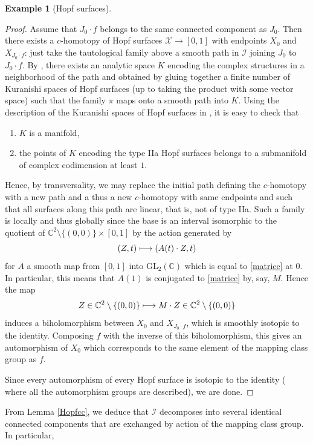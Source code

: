 \documentclass[JEP,XML,SOM,Unicode]{cedram}
\let\mathcal\mathscr
\def\mto{\mathchoice{\longmapsto}{\mapsto}{\mapsto}{\mapsto}}
\newcommand{\GL}{\mathrm{GL}}
\theoremstyle{plain}
\theoremstyle{definition}
\newtheorem{example}[theorem]{Example}
\theoremstyle{remark}
\numberwithin{equation}{section}
\newcommand{\CC}{{\mathbb{C}}}
\newcommand{\cI}{\mathcal{I}}
\begin{document}
\begin{example}[Hopf surfaces]
\begin{proof}
Assume that $J_0\cdot f$ belongs to the same connected component as $J_0$. Then there exists a $c$-homotopy of Hopf surfaces $\mathcal X\to [0,1]$ with endpoints $X_0$ and $X_{J_0\cdot f}$: just take the tautological family above a smooth path in $\cI$ joining $J_0$ to $J_0\cdot f$. By \cite[Th.\,8.1]{circle}, there exists an analytic space $K$ encoding the complex structures in a neighborhood of the path and obtained by gluing together a finite number of Kuranishi spaces of Hopf surfaces (up to taking the product with some vector space) such that the family $\pi$ maps onto a smooth path into $K$. Using the description of the Kuranishi spaces of Hopf surfaces in \cite[Th.\,2]{We}, it is easy to check that
\begin{enumerate}
\item
$K$ is a manifold,
\item
the points of $K$ encoding the type IIa Hopf surfaces belongs to a submanifold of complex codimension at least $1$.
\end{enumerate}
Hence, by transversality, we may replace the initial path defining the $c$-homotopy with a new path and a thus a new $c$-homotopy with same endpoints and such that all surfaces along this path are linear, that is, not of type IIa.
Such a family is \hbox{locally} and thus globally since the base is an interval isomorphic to the quotient of \hbox{$\CC^2\setminus\{(0,0)\}\times [0,1]$} by the action generated by
\[
(Z,t)\mto (A(t)\cdot Z, t)
\]
for $A$ a smooth map from $[0,1]$ into $\GL_2(\CC)$ which is equal to \eqref{matrice} at $0$.
In particular, this means that $A(1)$ is conjugated to \eqref{matrice} by, say, $M$. Hence the map
\begin{equation}
\label{lineaire}
Z\in \CC^2\setminus\{(0,0)\}\mto M\cdot Z\in \CC^2\setminus\{(0,0)\}
\end{equation}
induces a biholomorphism between $X_0$ and $X_{J_0\cdot f}$, which is smoothly isotopic to the identity. Composing $f$ with the inverse of this biholomorphism, this gives an automorphism of $X_0$ which corresponds to the same element of the mapping class group as $f$.

Since every automorphism of every Hopf surface is isotopic to the identity (\cf \cite[p.\,24]{We} where all the automorphism groups are described), we are done.
\end{proof}
From Lemma \ref{Hopfcc}, we deduce that $\cI$ decomposes into several identical connected components that are exchanged by action of the mapping class group. In particular,


\end{example}
\end{document}
